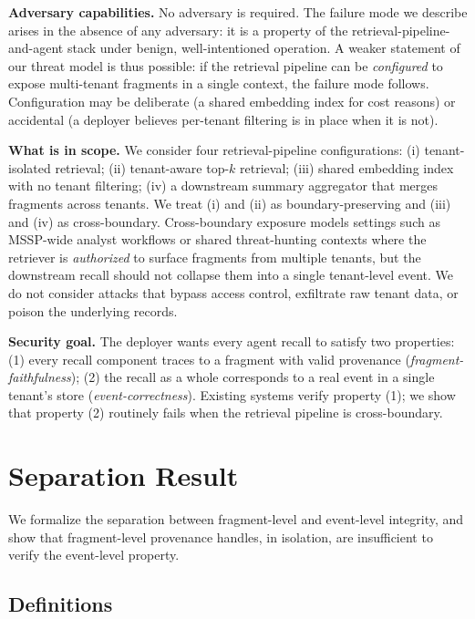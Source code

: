 \documentclass[conference,compsoc]{IEEEtran}
\begin{document}
\textbf{Adversary capabilities.}
No adversary is required. The failure mode we describe arises in the absence of any adversary: it is a property of the retrieval-pipeline-and-agent stack under benign, well-intentioned operation. A weaker statement of our threat model is thus possible: if the retrieval pipeline can be \emph{configured} to expose multi-tenant fragments in a single context, the failure mode follows. Configuration may be deliberate (a shared embedding index for cost reasons) or accidental (a deployer believes per-tenant filtering is in place when it is not).

\textbf{What is in scope.}
We consider four retrieval-pipeline configurations: (i) tenant-isolated retrieval; (ii) tenant-aware top-$k$ retrieval; (iii) shared embedding index with no tenant filtering; (iv) a downstream summary aggregator that merges fragments across tenants. We treat (i) and (ii) as boundary-preserving and (iii) and (iv) as cross-boundary. Cross-boundary exposure models settings such as MSSP-wide analyst workflows or shared threat-hunting contexts where the retriever is \emph{authorized} to surface fragments from multiple tenants, but the downstream recall should not collapse them into a single tenant-level event. We do not consider attacks that bypass access control, exfiltrate raw tenant data, or poison the underlying records.

\textbf{Security goal.}
The deployer wants every agent recall to satisfy two properties: (1) every recall component traces to a fragment with valid provenance (\emph{fragment-faithfulness}); (2) the recall as a whole corresponds to a real event in a single tenant's store (\emph{event-correctness}). Existing systems verify property (1); we show that property (2) routinely fails when the retrieval pipeline is cross-boundary.

\section{Separation Result}\label{sec:separation}

We formalize the separation between fragment-level and event-level integrity, and show that fragment-level provenance handles, in isolation, are insufficient to verify the event-level property.

\subsection{Definitions}
\end{document}
